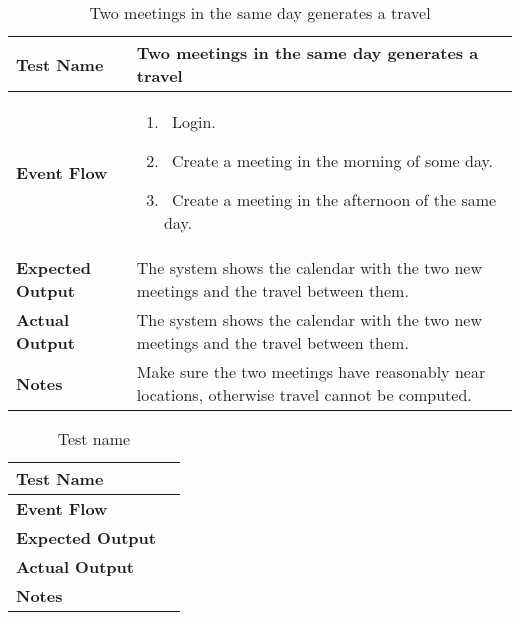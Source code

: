 \begin{table}[h]	
\centering
\def\arraystretch{1.5}
\begin{tabular}{|m{7cm}|m{7cm}|}
	\hline
	\textbf{Test Name}            &  Two meetings in the same day generates a travel  \\ \hline
	\textbf{Event Flow}             & 
		\begin{enumerate}
			\item~Login.
			\item~Create a meeting in the morning of some day.
			\item~Create a meeting in the afternoon of the same day.
		\end{enumerate}
	  \\ \hline
	\textbf{Expected Output}  &   The system shows the calendar with the two new meetings and the travel between them.  \\ \hline
	\textbf{Actual Output}       &  The system shows the calendar with the two new meetings and the travel between them.   \\ \hline
	\textbf{Notes} &  Make sure the two meetings have reasonably near locations, otherwise travel cannot be computed.  \\ \hline
\end{tabular}
\caption{Two meetings in the same day generates a travel}
\end{table}


\begin{table}[h]	
\centering
\def\arraystretch{1.5}
\begin{tabular}{|m{7cm}|m{7cm}|}
	\hline
	\textbf{Test Name}            &    \\ \hline
	\textbf{Event Flow}             &   \\ \hline
	\textbf{Expected Output}  &     \\ \hline
	\textbf{Actual Output}       &     \\ \hline
	\textbf{Notes} & \\ \hline
\end{tabular}
\caption{Test name}
\end{table}


